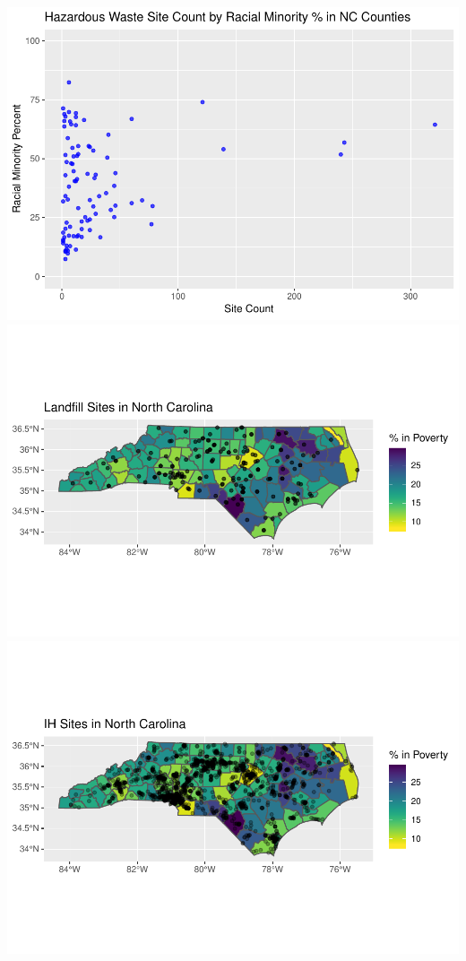 \documentclass[12pt,]{article}
\begin{document}
\includegraphics{Townsend_Project_Template_files/figure-latex/final visualizations-6.pdf}
\includegraphics{Townsend_Project_Template_files/figure-latex/final visualizations-7.pdf}
\includegraphics{Townsend_Project_Template_files/figure-latex/final visualizations-8.pdf}
\end{document}
